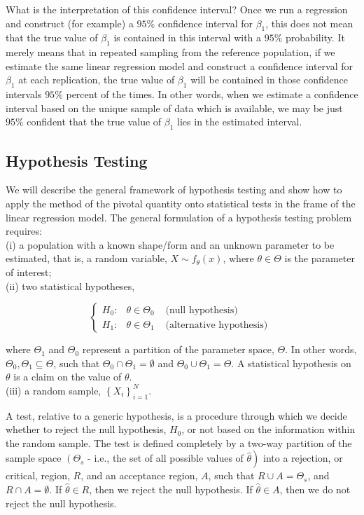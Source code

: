 What is the interpretation of this confidence interval? Once we run a regression and construct (for example) a $95 \%$ confidence interval for $\beta_{1}$, this does not mean that the true value of $\beta_{1}$ is contained in this interval with a $95 \%$ probability. It merely means that in repeated sampling from the reference population, if we estimate the same linear regression model and construct a confidence interval for $\beta_{1}$ at each replication, the true value of $\beta_{1}$ will be contained in those confidence intervals $95 \%$ percent of the times. In other words, when we estimate a confidence interval based on the unique sample of data which is available, we may be just $95 \%$ confident that the true value of $\beta_{1}$ lies in the estimated interval.

\subsection{Hypothesis Testing}
We will describe the general framework of hypothesis testing and show how to apply the method of the pivotal quantity onto statistical tests in the frame of the linear regression model. The general formulation of a hypothesis testing problem requires:\\
(i) a population with a known shape/form and an unknown parameter to be estimated, that is, a random variable, $X \sim f_{\theta}(x)$, where $\theta \in \Theta$ is the parameter of interest;\\
(ii) two statistical hypotheses,

$$
\left\{\begin{array}{llr}
H_{0}: & \theta \in \Theta_{0} & \text { (null hypothesis) } \\
H_{1}: & \theta \in \Theta_{1} & \text { (alternative hypothesis) }
\end{array}\right.
$$

where $\Theta_{1}$ and $\Theta_{0}$ represent a partition of the parameter space, $\Theta$. In other words, $\Theta_{0}, \Theta_{1} \subseteq \Theta$, such that $\Theta_{0} \cap \Theta_{1}=\emptyset$ and $\Theta_{0} \cup \Theta_{1}=\Theta$. A statistical hypothesis on $\theta$ is a claim on the value of $\theta$.\\
(iii) a random sample, $\left\{X_{i}\right\}_{i=1}^{N}$.

A test, relative to a generic hypothesis, is a procedure through which we decide whether to reject the null hypothesis, $H_{0}$, or not based on the information within the random sample. The test is defined completely by a two-way partition of the sample space $\left(\Theta_{s}\right.$ - i.e., the set of all possible values of $\left.\widehat{\theta}\right)$ into a rejection, or critical, region, $R$, and an acceptance region, $A$, such that $R \cup A=\Theta_{s}$, and $R \cap A=\emptyset$. If $\widehat{\theta} \in R$, then we reject the null hypothesis. If $\widehat{\theta} \in A$, then we do not reject the null hypothesis.


